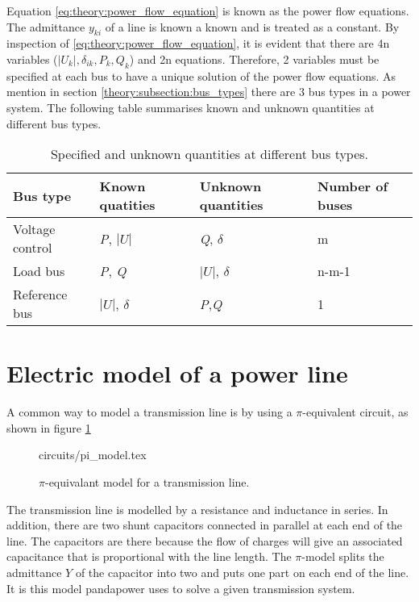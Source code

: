 \documentclass[class=book, crop=false]{standalone}
\begin{document}
Equation \eqref{eq:theory:power_flow_equation} is known as the power flow equations. The admittance $y_{ki}$ of a line is known a known and is treated as a constant. By inspection of \eqref{eq:theory:power_flow_equation}, it is evident that there are 4n variables ($|U_{k}|,\delta_{ik}, P_{k}, Q_{k}$) and 2n equations. Therefore, 2 variables must be specified at each bus to have a unique solution of the power flow equations. 
As mention in section \ref{theory:subsection:bus_types} there are 3 bus types in a power system. The following table summarises known and unknown quantities at different bus types.


\begin{table}[h]
\centering
\caption{Specified and unknown quantities at different bus types. }
\label{table:large_deals}
\begin{tabular}{l|lll}

Bus type  & Known quatities   & Unknown quantities & Number of buses \\ \hline
Voltage control      & \textit{P}, $|U|$   &  \textit{Q}, $\delta$ & m   \\ 
Load bus    & \textit{P}, \textit{Q}    & $|U|$, $\delta$ & n-m-1 \\ 
Reference bus & $|U|$, $\delta$ & \textit{P},\textit{Q}  & 1 \\ \hline
\end{tabular}
\end{table}




\section{Electric model of a power line}
A common way to model a transmission line is by using a $\pi$-equivalent circuit, as shown in figure \ref{fig:theory:PI_model}

\begin{figure}[ht!]
    \center
    {circuits/pi_model.tex}
    \caption{$\pi$-equivalant model for a transmission line.}
    \label{fig:theory:PI_model}
\end{figure}



The transmission line is modelled by a resistance and inductance in series. In addition, there are two shunt capacitors connected in parallel at each end of the line. The capacitors are there because the flow of charges will give an associated capacitance that is proportional with the line length. The $\pi$-model splits the admittance $Y$ of the capacitor into two and puts one part on each end of the line. It is this model pandapower uses to solve a given transmission system. 
\end{document}
